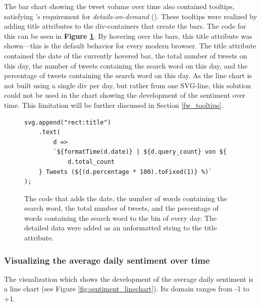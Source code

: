 The bar chart showing the tweet volume over time also contained tooltips, satisfying \citeauthor{shneidermanEyesHaveIt1996}'s requirement for \emph{details-on-demand} (\cite{shneidermanEyesHaveIt1996}). These tooltips were realized by adding title attributes to the div-containers that create the bars. The code for this can be seen in \textbf{Figure \ref{code:details_title}}. By hovering over the bars, this title attribute was shown---this is the default behavior for every modern browser. The title attribute contained the date of the currently hovered bar, the total number of tweets on this day, the number of tweets containing the search word on this day, and the percentage of tweets containing the search word on this day. As the line chart is not built using a single div per day, but rather from one SVG-line, this solution could not be used in the chart showing the development of the sentiment over time. This limitation will be further discussed in Section \ref{fw_tooltips}.

\begin{figure}[h!]
    \begin{verbatim}
svg.append("rect:title")
    .text(
        d =>
        `${formatTime(d.date)} | ${d.query_count} von ${
            d.total_count
    } Tweets (${(d.percentage * 100).toFixed(1)} %)`
);
    \end{verbatim}
    \caption{The code that adds the date, the number of words containing the search word, the total number of tweets, and the percentage of words containing the search word to the bin of every day. The detailed data were added as an unformatted string to the title attribute.}
    \label{code:details_title}
\end{figure}

\subsubsection{Visualizing the average daily sentiment over time}
The visualization which shows the development of the average daily sentiment is a line chart (see Figure \ref{fig:sentiment_linechart}). Its domain ranges from -1 to +1.

